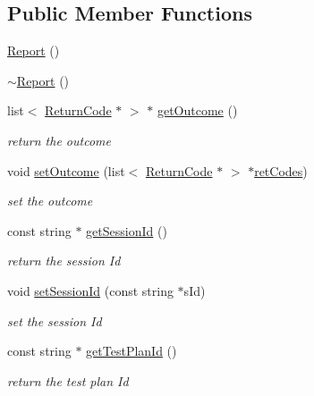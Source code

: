 \subsection*{Public Member Functions}
\begin{DoxyCompactItemize}
\item 
\hyperlink{classit_1_1testbench_1_1data_1_1Report_a040e3645a44c2c9481229447e5689982}{Report} ()
\item 
\hyperlink{classit_1_1testbench_1_1data_1_1Report_ad6977f9cf220f42136f93ec424ebf9ec}{$\sim$\-Report} ()
\item 
list$<$ \hyperlink{structit_1_1testbench_1_1data_1_1ReturnCode}{Return\-Code} $\ast$ $>$ $\ast$ \hyperlink{classit_1_1testbench_1_1data_1_1Report_ae7d609a1fa65a807f40474fff88e94c5}{get\-Outcome} ()
\begin{DoxyCompactList}\small\item\em return the outcome \end{DoxyCompactList}\item 
void \hyperlink{classit_1_1testbench_1_1data_1_1Report_a9163735df90435333cf61acce143663f}{set\-Outcome} (list$<$ \hyperlink{structit_1_1testbench_1_1data_1_1ReturnCode}{Return\-Code} $\ast$ $>$ $\ast$\hyperlink{classit_1_1testbench_1_1data_1_1Report_acc1760bcf43858c4413c6fe9b0e065f6}{ret\-Codes})
\begin{DoxyCompactList}\small\item\em set the outcome \end{DoxyCompactList}\item 
const string $\ast$ \hyperlink{classit_1_1testbench_1_1data_1_1Report_a06289f57b3273875927847341553dbc7}{get\-Session\-Id} ()
\begin{DoxyCompactList}\small\item\em return the session Id \end{DoxyCompactList}\item 
void \hyperlink{classit_1_1testbench_1_1data_1_1Report_a9206b42a1a76b23203bff18d8ca47ac7}{set\-Session\-Id} (const string $\ast$s\-Id)
\begin{DoxyCompactList}\small\item\em set the session Id \end{DoxyCompactList}\item 
const string $\ast$ \hyperlink{classit_1_1testbench_1_1data_1_1Report_afa358846f35ef387086e033ab71332fd}{get\-Test\-Plan\-Id} ()
\begin{DoxyCompactList}\small\item\em return the test plan Id \end{DoxyCompactList}\item 

\end{DoxyCompactItemize}
